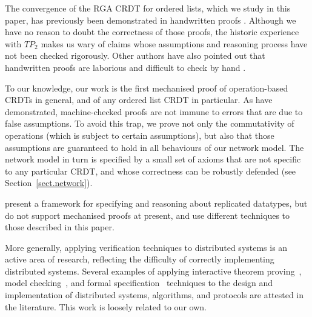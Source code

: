 The convergence of the RGA CRDT for ordered lists, which we study in this paper, has previously been
demonstrated in handwritten proofs \cite{Attiya:2016kh,Kleppmann:2016ve,Roh:2009ws}. Although we
have no reason to doubt the correctness of those proofs, the historic experience with
$\mathit{TP}_2$ makes us wary of claims whose assumptions and reasoning process have not been
checked rigorously. Other authors have also pointed out that handwritten proofs are laborious and
difficult to check by hand \cite{Li:2008hw,Li:2005jq}.

To our knowledge, our work is the first mechanised proof of operation-based CRDTs in general, and of
any ordered list CRDT in particular. As \citet{Oster:2005vi} have demonstrated, machine-checked
proofs are not immune to errors that are due to false assumptions. To avoid this trap, we prove not
only the commutativity of operations (which is subject to certain assumptions), but also that those
assumptions are guaranteed to hold in all behaviours of our network model. The network model in turn
is specified by a small set of axioms that are not specific to any particular CRDT, and whose
correctness can be robustly defended (see Section~\ref{sect.network}).

\citet{Burckhardt:2014ft} present a framework for specifying and reasoning about replicated datatypes, but do not support mechanised proofs at present, and use different techniques to those described in this paper.

More generally, applying verification techniques to distributed systems is an active area of research, reflecting the difficulty of correctly implementing distributed systems.
Several examples of applying interactive theorem proving~\cite{DBLP:conf/pldi/WilcoxWPTWEA15,DBLP:journals/afp/DebratM12,DBLP:conf/sss/Charron-BostDM11}, model checking~\cite{DBLP:conf/asm/AzmyMW16,DBLP:journals/entcs/JohnsonLLV04}, and formal specification~\cite{DBLP:journals/ijaacs/TounsiMM16,DBLP:conf/asm/AndriamiarinaMS14,DBLP:conf/wetice/TounsiMM13} techniques to the design and implementation of distributed systems, algorithms, and protocols are attested in the literature.
This work is loosely related to our own.
